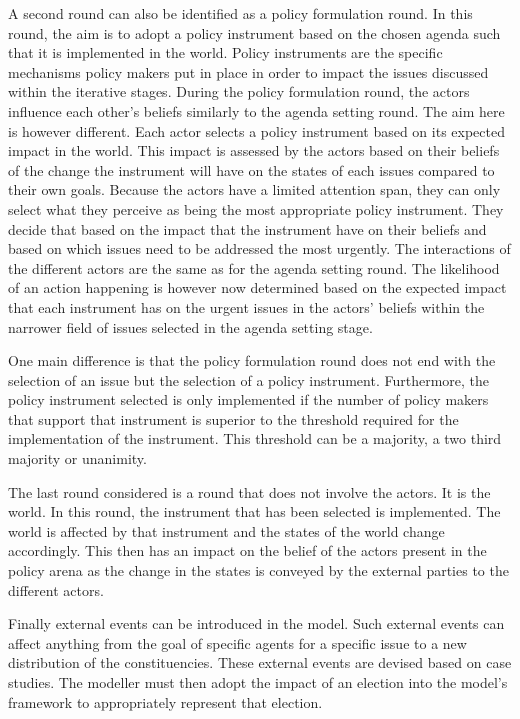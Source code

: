 A second round can also be identified as a policy formulation round. In this round, the aim is to adopt a policy instrument based on the chosen agenda such that it is implemented in the world. Policy instruments are the specific mechanisms policy makers put in place in order to impact the issues discussed within the iterative stages. During the policy formulation round, the actors influence each other’s beliefs similarly to the agenda setting round. The aim here is however different. Each actor selects a policy instrument based on its expected impact in the world. This impact is assessed by the actors based on their beliefs of the change the instrument will have on the states of each issues compared to their own goals. Because the actors have a limited attention span, they can only select what they perceive as being the most appropriate policy instrument. They decide that based on the impact that the instrument have on their beliefs and based on which issues need to be addressed the most urgently. The interactions of the different actors are the same as for the agenda setting round. The likelihood of an action happening is however now determined based on the expected impact that each instrument has on the urgent issues in the actors’ beliefs within the narrower field of issues selected in the agenda setting stage.

One main difference is that the policy formulation round does not end with the selection of an issue but the selection of a policy instrument. Furthermore, the policy instrument selected is only implemented if the number of policy makers that support that instrument is superior to the threshold required for the implementation of the instrument. This threshold can be a majority, a two third majority or unanimity.

The last round considered is a round that does not involve the actors. It is the world. In this round, the instrument that has been selected is implemented. The world is affected by that instrument and the states of the world change accordingly. This then has an impact on the belief of the actors present in the policy arena as the change in the states is conveyed by the external parties to the different actors.

Finally external events can be introduced in the model. Such external events can affect anything from the goal of specific agents for a specific issue to a new distribution of the constituencies. These external events are devised based on case studies. The modeller must then adopt the impact of an election into the model’s framework to appropriately represent that election.

